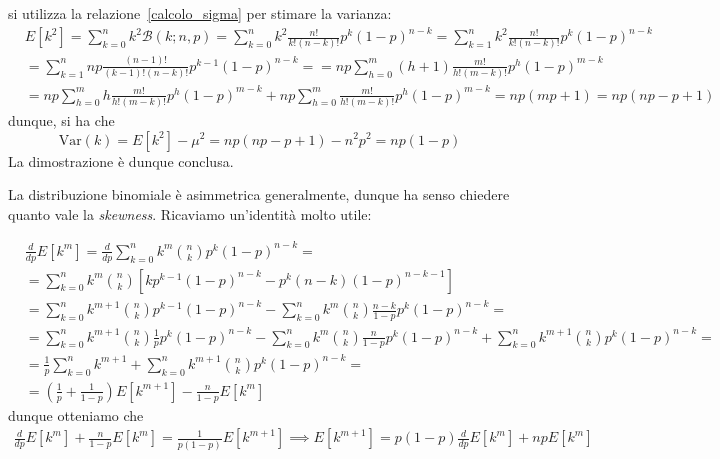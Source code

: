 \documentclass{report}
\begin{document}
\begin{myproof}
si utilizza la relazione~\ref{calcolo_sigma} per stimare la varianza:
\begin{align*}
&E[k^2] = \sum_{k=0}^n k^2 \mathcal{B}(k;n,p) = \sum_{k=0}^n k^2 \frac{n!}{k!(n-k)!}p^k (1-p)^{n-k} = \sum_{k=1}^n k^2 \frac{n!}{k!(n-k)!}p^k (1-p)^{n-k} \\
&= \sum_{k=1}^n np \frac{(n-1)!}{(k-1)!(n-k)!}p^{k-1}(1-p)^{n-k} = = np\sum_{h=0}^m (h+1)\frac{m!}{h!(m-k)!}p^{h}(1-p)^{m-k} \\
&= np \sum_{h=0}^m h\frac{m!}{h!(m-k)!}p^h (1-p)^{m-k} + np\sum_{h=0}^m \frac{m!}{h!(m-k)!}p^h (1-p)^{m-k} = np(mp + 1) = np(np-p+1)
\end{align*}
dunque, si ha che
$$
\text{Var}(k) = E[k^2]-\mu^2 = np(np-p+1) - n^2p^2 = np(1-p)
$$
La dimostrazione è dunque conclusa.
\end{myproof}
La distribuzione binomiale è asimmetrica generalmente, dunque ha senso chiedere quanto vale la \emph{skewness}. Ricaviamo un'identità molto utile:
\begin{myproof}
	\begin{align*}	
	&\frac{d}{dp} E[k^m] = \frac{d}{dp} \sum_{k=0}^n k^m \binom{n}{k}p^k(1-p)^{n-k} = \\
	&=\sum_{k=0}^n k^m \binom{n}{k} \left[ kp^{k-1} (1-p)^{n-k} - p^{k}(n-k)(1-p)^{n-k-1} \right] \\
	&= \sum_{k=0}^n k^{m+1} \binom{n}{k} p^{k-1}(1-p)^{n-k} - \sum_{k=0}^n k^{m} \binom{n}{k} \frac{n-k}{1-p}p^k(1-p)^{n-k} = \\ 
	&= \sum_{k=0}^n k^{m+1} \binom{n}{k} \frac{1}{p} p^{k}(1-p)^{n-k} - \sum_{k=0}^n k^{m} \binom{n}{k} \frac{n}{1-p} p^k(1-p)^{n-k} + \sum_{k=0}^n k^{m+1} \binom{n}{k} p^k(1-p)^{n-k}	= \\
	&= \frac{1}{p} \sum_{k=0}^n k^{m+1} + \sum_{k=0}^n k^{m+1}\binom{n}{k}p^k (1-p)^{n-k} = \\
	&= (\frac{1}{p} + \frac{1}{1-p})E[k^{m+1}] -\frac{n}{1-p}E[k^m]
	\end{align*}
	dunque otteniamo che
	\begin{align*}
	\frac{d}{dp}E[k^m] + \frac{n}{1-p}E[k^m] = \frac{1}{p(1-p)}E[k^{m+1}] \implies E[k^{m+1}] = p(1-p)\frac{d}{dp} E[k^m] + npE[k^m]
	\end{align*}
\end{myproof}
\end{document}
